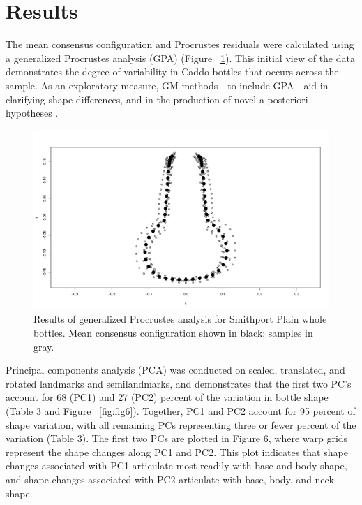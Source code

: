 \documentclass[article]{sa}
\begin{document}
\section*{Results}

The mean consensus configuration and Procrustes residuals were calculated using a generalized Procrustes analysis (GPA) (Figure ~\ref{fig:fig5}). This initial view of the data demonstrates the degree of variability in Caddo bottles that occurs across the sample. As an exploratory measure, GM methods—to include GPA—aid in clarifying shape differences, and in the production of novel a posteriori hypotheses \citep{RN1720}.

\begin{figure}[ht]\centering
\includegraphics[width=\linewidth]{Figure_05}
\caption{Results of generalized Procrustes analysis for Smithport Plain whole bottles. Mean consensus configuration shown in black; samples in gray.}
\label{fig:fig5}
\end{figure}

Principal components analysis (PCA) was conducted on scaled, translated, and rotated landmarks and semilandmarks, and demonstrates that the first two PC’s account for 68 (PC1) and 27 (PC2) percent of the variation in bottle shape (Table 3 and Figure ~\ref{fig:fig6}). Together, PC1 and PC2 account for 95 percent of shape variation, with all remaining PCs representing three or fewer percent of the variation (Table 3). The first two PCs are plotted in Figure 6, where warp grids represent the shape changes along PC1 and PC2. This plot indicates that shape changes associated with PC1 articulate most readily with base and body shape, and shape changes associated with PC2 articulate with base, body, and neck shape.
\end{document}
